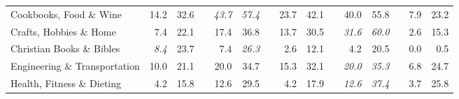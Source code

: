 \documentclass[12pt]{article}
\numberwithin{equation}{section}
\numberwithin{figure}{section}
\begin{document}
\begin{table}[]
{\begin{tabular}{lrrrrrrrrrrrrrr}
	Cookbooks, Food \& Wine        & 14.2                               & 32.6                               &                               & \textit{43.7}                      & \textit{57.4}                      &                               & 23.7                               & 42.1                               &                               & 40.0                               & 55.8                               &                               & 7.9                                & 23.2                               \\
	Crafts, Hobbies \& Home        & 7.4                                & 22.1                               &                               & 17.4                               & 36.8                               &                               & 13.7                               & 30.5                               &                               & \textit{31.6}                      & \textit{60.0}                      &                               & 2.6                                & 15.3                               \\
	Christian Books \& Bibles      & \textit{8.4}                       & 23.7                               &                               & 7.4                                & \textit{26.3}                      &                               & 2.6                                & 12.1                               &                               & 4.2                                & 20.5                               &                               & 0.0                                & 0.5                                \\
	Engineering \& Transportation  & 10.0                               & 21.1                               &                               & 20.0                               & 34.7                               &                               & 15.3                               & 32.1                               &                               & \textit{20.0}                      & \textit{35.3}                      &                               & 6.8                                & 24.7                               \\
	Health, Fitness \& Dieting     & 4.2                                & 15.8                               &                               & 12.6                               & 29.5                               &                               & 4.2                                & 17.9                               &                               & \textit{12.6}                      & \textit{37.4}                      &                               & 3.7                                & 25.8                               \\

\end{tabular}}
\end{table}
\end{document}
